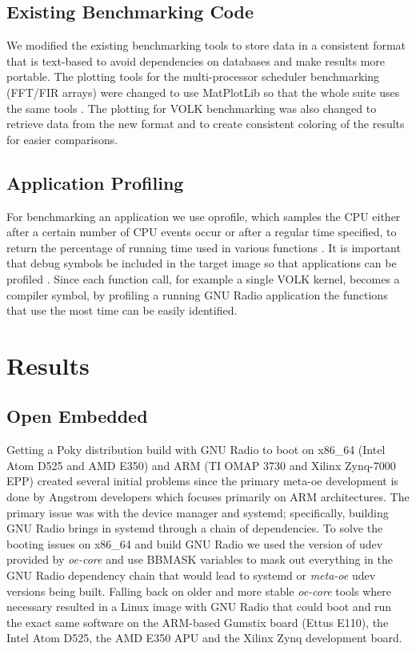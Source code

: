 \documentclass[english]{article}
\begin{document}
\subsection{Existing Benchmarking Code}
We modified the existing benchmarking tools to store data in a consistent format that is text-based to avoid dependencies on databases and make results more portable. 
The plotting tools for the multi-processor scheduler benchmarking (FFT/FIR arrays) were changed to use MatPlotLib so that the whole suite uses the same tools \cite{matplotlib}. 
The plotting for VOLK benchmarking was also changed to retrieve data from the new format and to create consistent coloring of the results for easier comparisons. 

\subsection{Application Profiling}
For benchmarking an application we use oprofile, which samples the CPU either after a certain number of CPU events occur or after a regular time specified, to return the percentage of running time used in various functions \cite{yocto-ref,oprofile}.
It is important that debug symbols be included in the target image so that applications can be profiled \cite{yocto-ref}.
Since each function call, for example a single VOLK kernel, becomes a compiler symbol, by profiling a running GNU Radio application the functions that use the most time can be easily identified.

\section{Results}

\subsection{Open Embedded}
Getting a Poky distribution build with GNU Radio to boot on x86\_64 (Intel Atom D525 and AMD E350) and ARM (TI OMAP 3730 and Xilinx Zynq-7000 EPP) created several initial problems since the primary meta-oe development is done by Angstrom developers \cite{github-metaoe} which focuses primarily on ARM architectures.
The primary issue was with the device manager and systemd; specifically, building GNU Radio brings in systemd through a chain of dependencies.
To solve the booting issues on x86\_64 and build GNU Radio we used the version of udev provided by \textit{oe-core} and use BBMASK variables to mask out everything in the GNU Radio dependency chain that would lead to systemd or \textit{meta-oe} udev versions being built.
Falling back on older and more stable \textit{oe-core} tools where necessary resulted in a Linux image with GNU Radio that could boot and run the exact same software on the ARM-based Gumstix board (Ettus E110), the Intel Atom D525, the AMD E350 APU and the Xilinx Zynq development board.
\end{document}
